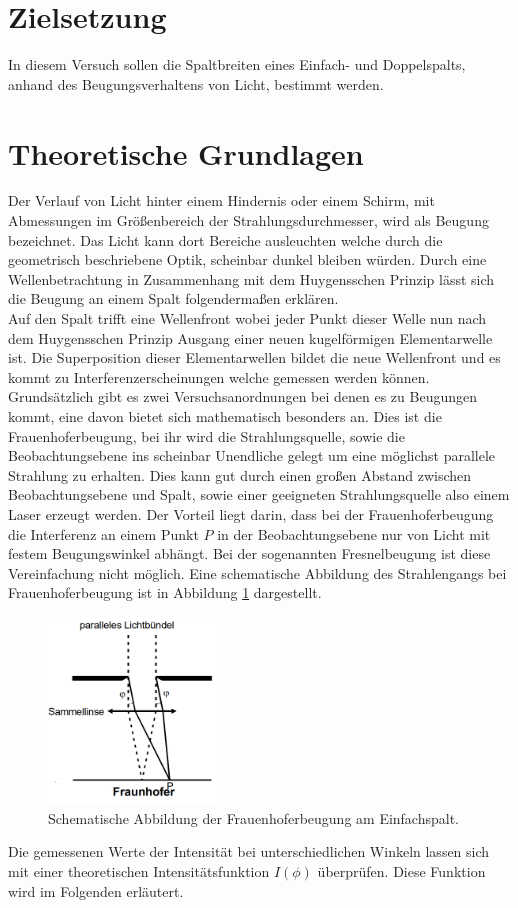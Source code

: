 \section{Zielsetzung}
In diesem Versuch sollen die Spaltbreiten eines Einfach- und Doppelspalts, anhand des Beugungsverhaltens von Licht, bestimmt werden.

\section{Theoretische Grundlagen}
Der Verlauf von Licht hinter einem Hindernis oder einem Schirm, mit Abmessungen im Größenbereich der Strahlungsdurchmesser, wird als Beugung bezeichnet. Das Licht kann dort Bereiche ausleuchten welche durch die geometrisch beschriebene Optik, scheinbar dunkel bleiben würden. Durch eine Wellenbetrachtung in Zusammenhang mit dem Huygensschen Prinzip lässt sich die Beugung an einem Spalt folgendermaßen erklären. 
\\
\newline
Auf den Spalt trifft eine Wellenfront wobei jeder Punkt dieser Welle nun nach dem Huygensschen Prinzip Ausgang einer neuen kugelförmigen Elementarwelle ist. Die Superposition dieser Elementarwellen bildet die neue Wellenfront und es kommt zu Interferenzerscheinungen welche gemessen werden können.
\\
\newline
Grundsätzlich gibt es zwei Versuchsanordnungen bei denen es zu Beugungen kommt, eine davon bietet sich mathematisch besonders an. Dies ist die Frauenhoferbeugung, bei ihr wird die Strahlungsquelle, sowie die Beobachtungsebene ins scheinbar Unendliche gelegt um eine möglichst parallele Strahlung zu erhalten. Dies kann gut durch einen großen Abstand zwischen Beobachtungsebene und Spalt, sowie einer geeigneten Strahlungsquelle also einem Laser erzeugt werden. Der Vorteil liegt darin, dass bei der Frauenhoferbeugung die Interferenz an einem Punkt $P$ in der Beobachtungsebene nur von Licht mit festem Beugungswinkel abhängt. Bei der sogenannten Fresnelbeugung ist diese Vereinfachung nicht möglich. Eine schematische Abbildung des Strahlengangs bei Frauenhoferbeugung ist in Abbildung \ref{fig:fig1} dargestellt.
\begin{figure}
    \centering
    \includegraphics[width=0.4\textwidth]{bilder/1.png}
    \caption{Schematische Abbildung der Frauenhoferbeugung am Einfachspalt. \cite{skript}} 
    \label{fig:fig1}
\end{figure}
Die gemessenen Werte der Intensität bei unterschiedlichen Winkeln lassen sich mit einer theoretischen Intensitätsfunktion $I(\phi)$ überprüfen. Diese Funktion wird im Folgenden erläutert.

